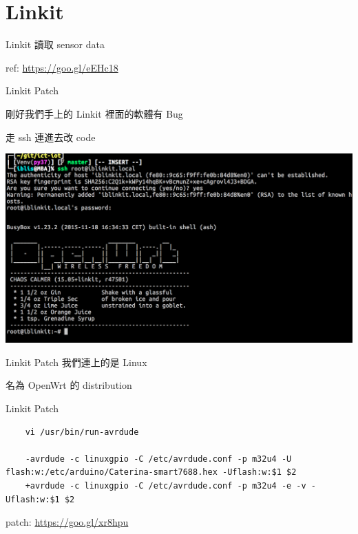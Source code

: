 \documentclass{beamer}
\begin{document}
\section{Linkit}

\begin{frame}
  \begin{center}
    \Huge
    Linkit 讀取 sensor data

    \small
    ref:
    \url{https://goo.gl/eEHc18}
  \end{center}
\end{frame}

\begin{frame}[fragile]{Linkit Patch}
  \begin{center}
    \large
    剛好我們手上的 Linkit 裡面的軟體有 Bug

    走 ssh 連進去改 code
  \end{center}

  \includegraphics[scale=0.215]{./img/ssh.png}
\end{frame}

\begin{frame}{Linkit Patch}
  \Huge
  我們連上的是 Linux

  名為 OpenWrt 的 distribution
\end{frame}

\begin{frame}[fragile]{Linkit Patch}
  \tiny
  \begin{verbatim}
    vi /usr/bin/run-avrdude

    -avrdude -c linuxgpio -C /etc/avrdude.conf -p m32u4 -U flash:w:/etc/arduino/Caterina-smart7688.hex -Uflash:w:$1 $2
    +avrdude -c linuxgpio -C /etc/avrdude.conf -p m32u4 -e -v -Uflash:w:$1 $2
  \end{verbatim}

  \begin{center}
    \small
    patch: \url{https://goo.gl/xr8hpu}
  \end{center}
\end{frame}
\end{document}
